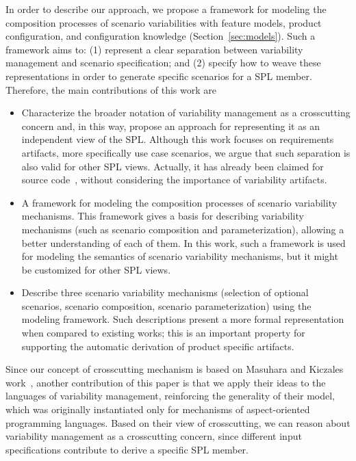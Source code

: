 \documentclass{report}
\begin{document}
\begin{frontmatter}
In order to describe our approach, we propose 
a framework for modeling the composition processes of scenario variabilities with feature models, product configuration, and configuration knowledge (Section~\ref{sec:models}). 
Such a framework aims to: (1) represent a clear separation between variability management 
and scenario specification; and (2) specify how to weave these representations in order to generate
specific scenarios for a SPL member. Therefore, the main contributions of this work are

\begin{itemize}

\item Characterize the broader notation of variability management as a crosscutting concern and, in this way, propose an approach for representing it as an independent view of the SPL. Although this work focuses on requirements artifacts, 
more specifically use case scenarios, we argue that such separation is also valid for other SPL views. Actually,
it has already been claimed for source code~\cite{alves-gpce-06, apel-icse2006}, without considering the importance of variability artifacts.  
  
\item A framework for modeling the composition processes of scenario variability mechanisms. 
This framework gives a basis for describing variability mechanisms (such as scenario composition and parameterization), 
allowing a better understanding of each of them. In this work, such a framework is used for modeling 
the semantics of scenario variability mechanisms, but it might be customized for other SPL views.

\item Describe three scenario variability mechanisms (selection of optional scenarios, scenario composition, scenario parameterization) 
using the modeling framework. Such descriptions present
a more formal representation when compared to existing works; this is an
important property for supporting the automatic derivation of product
specific artifacts.

\end{itemize}

Since our concept of crosscutting mechanism is based on Masuhara and Kiczales work~\cite{kiczales-ecoop-2003}, another 
contribution of this paper is that we apply their ideas to the languages of variability management,  reinforcing the generality of their model, which was originally instantiated only for mechanisms of aspect-oriented programming languages. Based on their view of crosscutting, we can reason about variability management as a crosscutting concern, since different input specifications contribute to derive a specific SPL member. 


\end{frontmatter}
\end{document}
